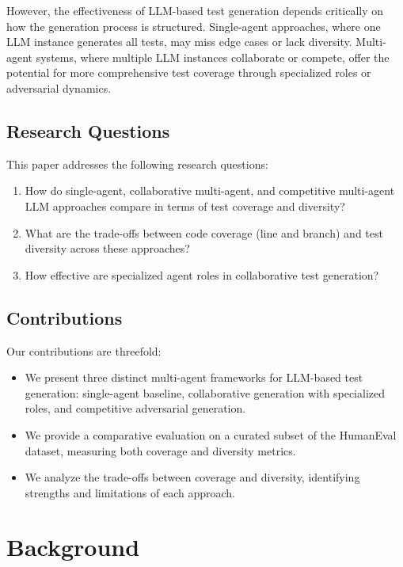 \documentclass[11pt]{article}
\begin{document}
However, the effectiveness of LLM-based test generation depends critically on how the generation process is structured. Single-agent approaches, where one LLM instance generates all tests, may miss edge cases or lack diversity. Multi-agent systems, where multiple LLM instances collaborate or compete, offer the potential for more comprehensive test coverage through specialized roles or adversarial dynamics.

\subsection{Research Questions}

This paper addresses the following research questions:

\begin{enumerate}
\item How do single-agent, collaborative multi-agent, and competitive multi-agent LLM approaches compare in terms of test coverage and diversity?
\item What are the trade-offs between code coverage (line and branch) and test diversity across these approaches?
\item How effective are specialized agent roles in collaborative test generation?
\end{enumerate}

\subsection{Contributions}

Our contributions are threefold:

\begin{itemize}
\item We present three distinct multi-agent frameworks for LLM-based test generation: single-agent baseline, collaborative generation with specialized roles, and competitive adversarial generation.
\item We provide a comparative evaluation on a curated subset of the HumanEval dataset, measuring both coverage and diversity metrics.
\item We analyze the trade-offs between coverage and diversity, identifying strengths and limitations of each approach.
\end{itemize}

\section{Background}
\end{document}
